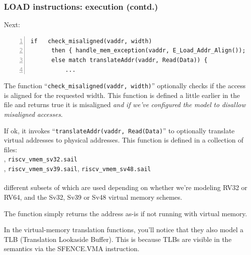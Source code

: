 \documentclass[aspectratio=169]{beamer}
\newcommand{\hm}{\hspace*{1em}}
\newcommand{\slidefont}{\scriptsize}
\newcommand{\cf}{\scriptsize\tt}
\begin{document}
\begin{frame}[fragile]
  \frametitle{LOAD instructions: execution (contd.)}

  \slidefont

  Next:

  \begin{Verbatim}[frame=single, numbers=left, label = File riscv\_insts\_base.sail]
      if   check_misaligned(vaddr, width)
      then { handle_mem_exception(vaddr, E_Load_Addr_Align()); RETIRE_FAIL }
      else match translateAddr(vaddr, Read(Data)) {
          ...
  \end{Verbatim}

  \begin{minipage}{\textwidth}
    The function ``{\cf check\_misaligned(vaddr, width)}'' optionally
    checks if the access is aligned for the requested width.  This
    function is defined a little earlier in the file and returns true
    it is misaligned \emph{and if we've configured the model to
      disallow misaligned accesses}.

    \vspace{1ex}

    If ok, it invokes ``{\cf translateAddr(vaddr, Read(Data)}'' to
    optionally translate virtual addresses to physical addresses.
    This function is defined in a collection of files: \\
    \hm {\cf riscv\_vmem\_rv32.sail}, {\cf riscv\_vmem\_sv32.sail} \\
    \hm {\cf riscv\_vmem\_rv64.sail}, {\cf riscv\_vmem\_sv39.sail}, {\cf riscv\_vmem\_sv48.sail} \\
    \hm {\cf riscv\_vmem\_tlb.sail} \\
    different subsets of which are used depending on whether we're
    modeling RV32 or RV64, and the Sv32, Sv39 or Sv48 virtual memory
    schemes.

    \vspace{1ex}

    The function simply returns the address as-is if not running with
    virtual memory.

    \vspace{1ex}

    In the virtual-memory translation functions, you'll notice that
    they also model a TLB (Translation Lookaside Buffer).  This is
    because TLBs are visible in the semantics via the SFENCE.VMA
    instruction.

  \end{minipage}


\end{frame}
\end{document}
